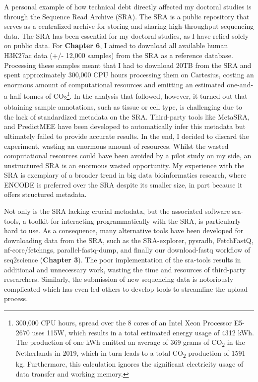 A personal example of how technical debt directly affected my doctoral studies is through the Sequence Read Archive (SRA). The SRA is a public repository that serves as a centralized archive for storing and sharing high-throughput sequencing data. The SRA has been essential for my doctoral studies, as I have relied solely on public data. For \textbf{Chapter 6}, I aimed to download all available human H3K27ac data (+/- 12,000 samples) from the SRA as a reference database. Processing these samples meant that I had to download 20TB from the SRA and spent approximately 300,000 CPU hours processing them on Cartesius, costing an enormous amount of computational resources and emitting an estimated one-and-a-half tonnes of CO\textsubscript{2}\footnote[2]{300,000 CPU hours, spread over the 8 cores of an Intel Xeon Processor E5-2670 uses 115W\cite{intelIntelXeon}, which results in a total estimated energy usage of 4312 kWh. The production of one kWh emitted an average of 369 grams of CO\textsubscript{2} in the Netherlands in 2019\cite{CO2}, which in turn leads to a total CO\textsubscript{2} production of 1591 kg. Furthermore, this calculation ignores the significant electricity usage of data transfer and working memory.}. In the analysis that followed, however, it turned out that obtaining sample annotations, such as tissue or cell type, is challenging due to the lack of standardized metadata on the SRA. Third-party tools like MetaSRA\cite{Bernstein2017}, and PredictMEE\cite{Klie2021} have been developed to automatically infer this metadata but ultimately failed to provide accurate results. In the end, I decided to discard the experiment, wasting an enormous amount of resources. Whilst the wasted computational resources could have been avoided by a pilot study on my side, an unstructured SRA is an enormous wasted opportunity. My experience with the SRA is exemplary of a broader trend in big data bioinformatics research, where ENCODE is preferred over the SRA despite its smaller size, in part because it offers structured metadata.

Not only is the SRA lacking crucial metadata, but the associated software sra-tools, a toolkit for interacting programmatically with the SRA, is particularly hard to use. As a consequence, many alternative tools have been developed for downloading data from the SRA, such as the SRA-explorer\cite{sraexplorer}, pysradb\cite{Choudhary2019}, FetchFastQ\cite{galvez2022metadata}, nf-core/fetchngs\cite{fetchngs}, parallel-fastq-dump\cite{parallelfastq}, and finally our download-fastq workflow of seq2science\cite{seq2science} (\textbf{Chapter 3}). The poor implementation of the sra-tools results in additional and unnecessary work, wasting the time and resources of third-party researchers. Similarly, the submission of new sequencing data is notoriously complicated which has even led others to develop tools to streamline the upload process\cite{Quiones2020}. 

